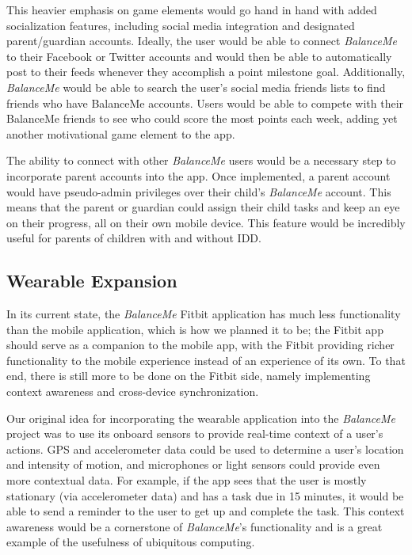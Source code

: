 \documentclass{sigchi}
\begin{document}
This heavier emphasis on game elements would go hand in hand with added
socialization features, including social media integration and designated
parent/guardian accounts. Ideally, the user would be able to connect
\textit{BalanceMe} to their Facebook or Twitter accounts and would then be able
to automatically post to their feeds whenever they accomplish a point milestone
goal. Additionally, \textit{BalanceMe} would be able to search the user’s
social media friends lists to find friends who have BalanceMe accounts. Users
would be able to compete with their BalanceMe friends to see who could score
the most points each week, adding yet another motivational game element to the
app.

The ability to connect with other \textit{BalanceMe} users would be a necessary
step to incorporate parent accounts into the app. Once implemented, a parent
account would have pseudo-admin privileges over their child’s \textit{BalanceMe}
account. This means that the parent or guardian could assign their child tasks
and keep an eye on their progress, all on their own mobile device. This feature
would be incredibly useful for parents of children with and without IDD.

\subsection{Wearable Expansion}
In its current state, the \textit{BalanceMe} Fitbit application has much less
functionality than the mobile application, which is how we planned it to be;
the Fitbit app should serve as a companion to the mobile app, with the Fitbit
providing richer functionality to the mobile experience instead of an
experience of its own. To that end, there is still more to be done on the
Fitbit side, namely implementing context awareness and cross-device
synchronization.

Our original idea for incorporating the wearable application into the
\textit{BalanceMe} project was to use its onboard sensors to provide real-time
context of a user’s actions. GPS and accelerometer data could be used to
determine a user’s location and intensity of motion, and microphones or light
sensors could provide even more contextual data. For example, if the app sees
that the user is mostly stationary (via accelerometer data) and has a task due
in 15 minutes, it would be able to send a reminder to the user to get up and
complete the task. This context awareness would be a cornerstone of
\textit{BalanceMe}’s functionality and is a great example of the usefulness of
ubiquitous computing.
\end{document}
